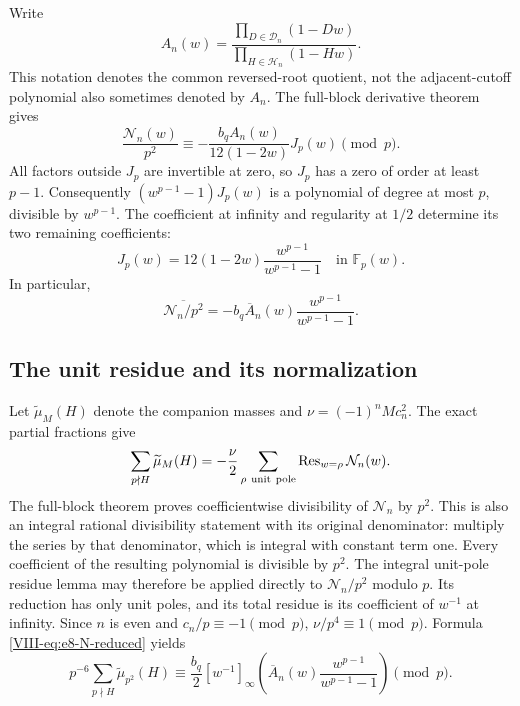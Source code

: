 \documentclass[11pt,letterpaper]{article}
\numberwithin{equation}{section}
\begin{document}
Write
\[
 A_n(w)=
 \frac{\prod_{D\in\mathcal D_n}(1-Dw)}
      {\prod_{H\in\mathcal H_n}(1-Hw)}.
\]
This notation denotes the common reversed-root quotient, not the
adjacent-cutoff polynomial also sometimes denoted by \(A_n\).
The full-block derivative theorem gives
\[
 \frac{\mathcal N_n(w)}{p^2}
   \equiv-\frac{b_qA_n(w)}{12(1-2w)}J_p(w)\pmod p.
\]
All factors outside \(J_p\) are invertible at zero, so \(J_p\) has a
zero of order at least \(p-1\).  Consequently
\((w^{p-1}-1)J_p(w)\) is a polynomial of degree at most \(p\),
divisible by \(w^{p-1}\).  The coefficient at infinity and regularity
at \(1/2\) determine its two remaining coefficients:
\begin{equation}\label{VIII-eq:e8-full-J}
 \boxed{J_p(w)=12(1-2w)\frac{w^{p-1}}{w^{p-1}-1}
       \quad\text{in }\mathbb F_p(w).}
\end{equation}
In particular,
\begin{equation}\label{VIII-eq:e8-N-reduced}
 \overline{\mathcal N_n/p^2}
    =-b_q\overline A_n(w)\frac{w^{p-1}}{w^{p-1}-1}.
\end{equation}

\subsection{The unit residue and its normalization}
Let \(\widetilde\mu_M(H)\) denote the companion masses and
\(\nu=(-1)^nMc_n^2\).  The exact partial fractions give
\[
 \sum_{p\nmid H}\widetilde\mu_M(H)
   =-\frac{\nu}{2}
       \sum_{\rho\ {\rm unit\ pole}}
                  \operatorname{Res}_{w=\rho}\mathcal N_n(w).
\]
The full-block theorem proves coefficientwise divisibility of
\(\mathcal N_n\) by \(p^2\).  This is also an integral rational
divisibility statement with its original denominator: multiply the
series by that denominator, which is integral with constant term one.
Every coefficient of the resulting polynomial is divisible by \(p^2\).
The integral unit-pole residue lemma may therefore be applied directly
to \(\mathcal N_n/p^2\) modulo \(p\).  Its reduction has only unit
poles, and its total residue is its coefficient of \(w^{-1}\) at
infinity.  Since \(n\) is even and \(c_n/p\equiv-1\pmod p\),
\(\nu/p^4\equiv1\pmod p\).  Formula \eqref{VIII-eq:e8-N-reduced} yields
\begin{equation}\label{VIII-eq:e8-unit-residue-final}
 p^{-6}\sum_{p\nmid H}\widetilde\mu_{p^2}(H)
 \equiv\frac{b_q}{2}[w^{-1}]_\infty
       \left(\overline A_n(w)\frac{w^{p-1}}{w^{p-1}-1}\right)
       \pmod p.
\end{equation}
\end{document}
